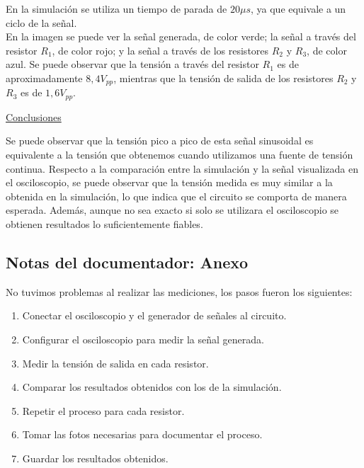    \sangria{} En la simulación se utiliza un tiempo de parada de $20\mu s$, ya que equivale a un ciclo de la señal.\\
    \sangria{} En la imagen se puede ver la señal generada, de color verde; la señal a través del resistor $R_1$, de color rojo; y la señal a través de los resistores $R_2$ y $R_3$, de color azul. 
    \saltoPag{}
    \sangria{} Se puede observar que la tensión a través del resistor $R_1$ es de aproximadamente $8,4V_{pp}$, mientras que la tensión de salida de los resistores $R_2$ y $R_3$ es de $1,6V_{pp}$.
    \noindent
    \begin{center} \underline{Conclusiones} \end{center}
    \sangria{} Se puede observar que la tensión pico a pico de esta señal sinusoidal es equivalente a la tensión que obtenemos cuando utilizamos una fuente de tensión continua. 
    \sangria{} Respecto a la comparación entre la simulación y la señal visualizada en el osciloscopio, se puede observar que la tensión medida es muy similar a la obtenida en la simulación, lo que indica que el circuito se comporta de manera esperada. Además, aunque no sea exacto si solo se utilizara el osciloscopio se obtienen resultados lo suficientemente fiables. 

    \subsection{Notas del documentador: Anexo}
    
    \sangria{} No tuvimos problemas al realizar las mediciones, los pasos fueron los siguientes:
    \begin{enumerate}
        \item Conectar el osciloscopio y el generador de señales al circuito.
        \item Configurar el osciloscopio para medir la señal generada.
        \item Medir la tensión de salida en cada resistor.
        \item Comparar los resultados obtenidos con los de la simulación.
        \item Repetir el proceso para cada resistor.
        \item Tomar las fotos necesarias para documentar el proceso.
        \item Guardar los resultados obtenidos.
    \end{enumerate}

    \columnbreak{}
    \text{}


